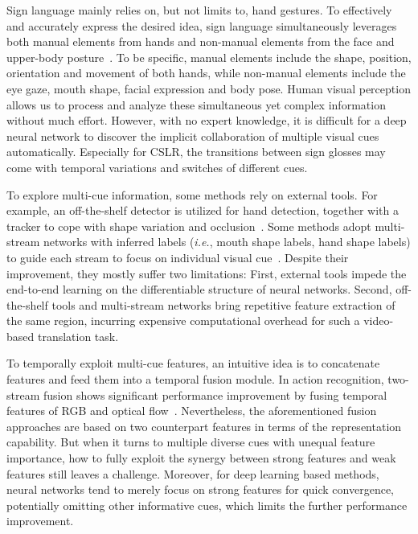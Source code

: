 \documentclass[letterpaper]{article} %
\begin{document}
Sign language mainly relies on, but not limits to, hand gestures. 
To effectively and accurately express the desired idea, sign language simultaneously leverages both manual elements from hands and non-manual elements from the face and upper-body posture~\cite{phoenixdataset2014}. 
To be specific, manual elements include the shape, position, orientation and movement of both hands, 
while non-manual elements include the eye gaze, mouth shape, facial expression and body pose. 
Human visual perception allows us to process and analyze these simultaneous yet complex information without much effort. 
However, with no expert knowledge, it is difficult for a deep neural network to discover the implicit collaboration of multiple visual cues automatically. 
Especially for CSLR, the transitions between sign glosses may come with temporal variations and switches of different cues.


To explore multi-cue information, some methods rely on external tools. 
For example, an off-the-shelf detector is utilized for hand detection, together with a tracker to cope with shape variation and occlusion~\cite{subunet,han}. 
Some methods adopt multi-stream networks with inferred labels (\emph{i.e.}, mouth shape labels, hand shape labels) to guide each stream to focus on individual visual cue~\cite{tpami19}. 
Despite their improvement, they mostly suffer two limitations: 
First, external tools impede the end-to-end learning on the differentiable structure of neural networks. 
Second, off-the-shelf tools and multi-stream networks bring repetitive feature extraction of the same region, incurring expensive computational overhead for such a video-based translation task.


To temporally exploit multi-cue features, an intuitive idea is to concatenate features and feed them into a temporal fusion module. In action recognition, two-stream fusion shows significant performance improvement by fusing temporal features of RGB and optical flow~\cite{vgg-two-stream,vgg-two-stream-2}. 
Nevertheless, the aforementioned fusion approaches are based on two counterpart features in terms of the representation capability. 
But when it turns to multiple diverse cues with unequal feature importance, how to fully exploit the synergy between strong features and weak features still leaves a challenge. 
Moreover, for deep learning based methods, neural networks tend to merely focus on strong features for quick convergence, potentially omitting other informative cues, which limits the further performance improvement.
\end{document}
